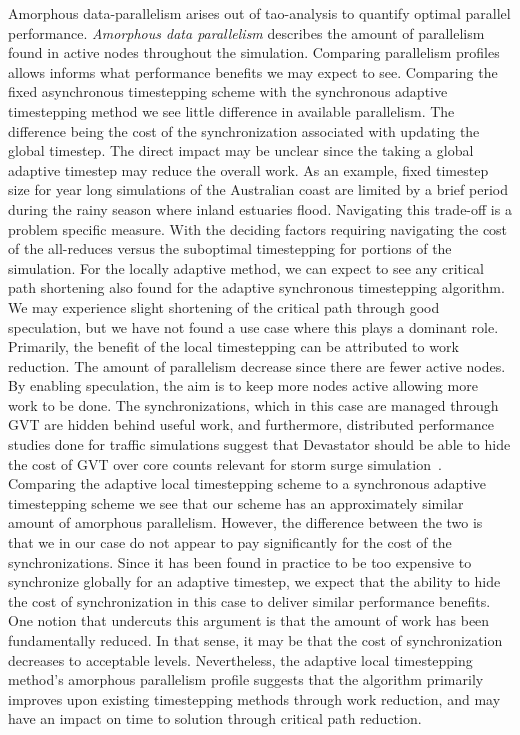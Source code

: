 Amorphous data-parallelism arises out of tao-analysis to quantify optimal parallel performance. {\em Amorphous data parallelism} describes the amount of parallelism found in active nodes throughout the simulation. Comparing parallelism profiles allows informs what performance benefits we may expect to see. Comparing the fixed asynchronous timestepping scheme with the synchronous adaptive timestepping method we see little difference in available parallelism. The difference being the cost of the synchronization associated with updating the global timestep. The direct impact may be unclear since the taking a global adaptive timestep may reduce the overall work. As an example, fixed timestep size for year long simulations of the Australian coast are limited by a brief period during the rainy season where inland estuaries flood. Navigating this trade-off is a problem specific measure. With the deciding factors requiring navigating the cost of the all-reduces versus the suboptimal timestepping for portions of the simulation. For the locally adaptive method, we can expect to see any critical path shortening also found for the adaptive synchronous timestepping algorithm. We may experience slight shortening of the critical path through good speculation, but we have not found a use case where this plays a dominant role. Primarily, the benefit of the local timestepping can be attributed to work reduction. The amount of parallelism decrease since there are fewer active nodes. By enabling speculation, the aim is to keep more nodes active allowing more work to be done. The synchronizations, which in this case are managed through GVT are hidden behind useful work, and furthermore, distributed performance studies done for traffic simulations suggest that Devastator should be able to hide the cost of GVT over core counts relevant for storm surge simulation~\cite{Chan2018}. Comparing the adaptive local timestepping scheme to a synchronous adaptive timestepping scheme we see that our scheme has an approximately similar amount of amorphous parallelism. However, the difference between the two is that we in our case do not appear to pay significantly for the cost of the synchronizations. Since it has been found in practice to be too expensive to synchronize globally for an adaptive timestep, we expect that the ability to hide the cost of synchronization in this case to deliver similar performance benefits. One notion that undercuts this argument is that the amount of work has been fundamentally reduced. In that sense, it may be that the cost of synchronization decreases to acceptable levels. Nevertheless, the adaptive local timestepping method's amorphous parallelism profile suggests that the algorithm primarily improves upon existing timestepping methods through work reduction, and may have an impact on time to solution through critical path reduction.


